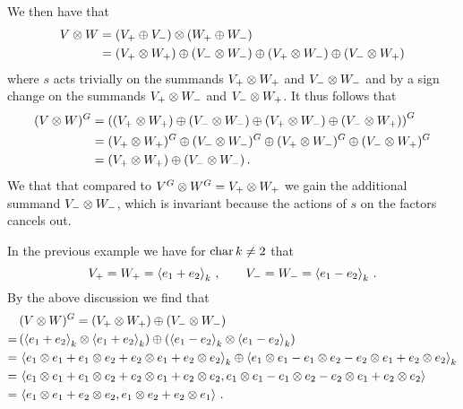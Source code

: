 \begin{remark}
  We then have that
  \begin{align*}
        V \mathbin{\otimes} W
    &=  (V_+ \oplus V_-) \mathbin{\otimes} (W_+ \oplus W_-) \\
    &=  (V_+ \mathbin{\otimes} W_+) \oplus (V_- \mathbin{\otimes} W_-) \oplus (V_+ \mathbin{\otimes} W_-) \oplus (V_- \mathbin{\otimes} W_+)
  \end{align*}
  where $s$ acts trivially on the summands $V_+ \mathbin{\otimes} W_+$ and $V_- \mathbin{\otimes} W_-$ and by a sign change on the summands $V_+ \mathbin{\otimes} W_-$ and $V_- \mathbin{\otimes} W_+$.
  It thus follows that
  \begin{align*}
        (V \mathbin{\otimes} W)^G
    &=  \left(
                  (V_+ \mathbin{\otimes} W_+)
          \oplus  (V_- \mathbin{\otimes} W_-)
          \oplus  (V_+ \mathbin{\otimes} W_-)
          \oplus  (V_- \mathbin{\otimes} W_+)
        \right)^G \\
    &=  (V_+ \mathbin{\otimes} W_+)^G \oplus (V_- \mathbin{\otimes} W_-)^G \oplus (V_+ \mathbin{\otimes} W_-)^G \oplus (V_- \mathbin{\otimes} W_+)^G  \\
    &=  (V_+ \mathbin{\otimes} W_+) \oplus (V_- \mathbin{\otimes} W_-) \,.
  \end{align*}
  We that that compared to $V^G \mathbin{\otimes} W^G = V_+ \mathbin{\otimes} W_+$ we gain the additional summand $V_- \mathbin{\otimes} W_-$, which is invariant because the actions of $s$ on the factors cancels out.
  
  In the previous example we have for $\operatorname{char} k \neq 2$ that
  \[
    V_+ = W_+ = \left\langle  e_1 + e_2  \right\rangle_k \,,
    \qquad
    V_- = W_- = \left\langle  e_1 - e_2  \right\rangle_k \,.
  \]
  By the above discussion we find that
  \begin{align*}
     &\,  (V \mathbin{\otimes} W)^G
    =     (V_+ \mathbin{\otimes} W_+) \oplus (V_- \mathbin{\otimes} W_-)  \\
    =&\,  (\left\langle e_1 + e_2 \right\rangle_k \mathbin{\otimes} \left\langle e_1 + e_2 \right\rangle_k) \oplus (\left\langle e_1 - e_2 \right\rangle_k \mathbin{\otimes} \left\langle e_1 - e_2 \right\rangle_k)  \\
    =&\,          \left\langle e_1 \mathbin{\otimes} e_1 + e_1 \mathbin{\otimes} e_2 + e_2 \mathbin{\otimes} e_1 + e_2 \mathbin{\otimes} e_2 \right\rangle_k
          \oplus  \left\langle e_1 \mathbin{\otimes} e_1 - e_1 \mathbin{\otimes} e_2 - e_2 \mathbin{\otimes} e_1 + e_2 \mathbin{\otimes} e_2 \right\rangle_k \\
    =&\,  \left\langle 
            e_1 \mathbin{\otimes} e_1 + e_1 \mathbin{\otimes} e_2 + e_2 \mathbin{\otimes} e_1 + e_2 \mathbin{\otimes} e_2,
            e_1 \mathbin{\otimes} e_1 - e_1 \mathbin{\otimes} e_2 - e_2 \mathbin{\otimes} e_1 + e_2 \mathbin{\otimes} e_2
           \right\rangle \\
    =&\,  \left\langle e_1 \mathbin{\otimes} e_1 + e_2 \mathbin{\otimes} e_2, e_1 \mathbin{\otimes} e_2 + e_2 \mathbin{\otimes} e_1 \right\rangle \,.
  \end{align*}
\end{remark}





